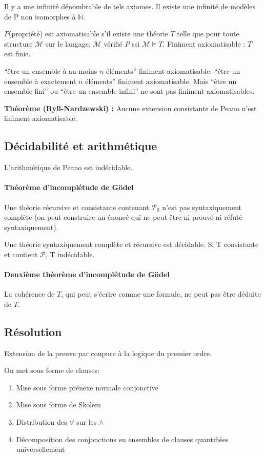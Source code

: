 \documentclass[french]{article}
\begin{document}
Il y a une infinité dénombrable de tels axiomes. Il existe une infinité de modèles de P non isomorphes à $\mathbb{N}$.

$P$(propriété) est axiomatisable s'il existe une théorie $T$ telle que pour toute structure $\mathcal{M}$ sur le langage, $\mathcal{M}$ vérifié $P$ ssi $\mathcal{M}\models T$. Finiment axiomatisable : $T$ est finie.

``être un ensemble à au moins $n$ éléments'' finiment axiomatisable.
``être un ensemble à exactement $n$ éléments'' finiment axiomatisable.
Mais ``être un ensemble fini'' ou ``être un ensemble infini'' ne sont pas finiment axiomatisables.

\textbf{Théorème (Ryll-Nardzewski) :} Aucune extension consistante de Peano n'est finiment axiomatisable.

\subsection{Décidabilité et arithmétique}
L'arithmétique de Peano est indécidable.
\paragraph{Théorème d'incomplétude de Gödel} Une théorie récursive et consistante contenant $\mathcal{P}_0$ n'est pas syntaxiquement complète (on peut construire un énoncé qui ne peut être ni prouvé ni réfuté syntaxiquement).

Une théorie syntaxiquement complète et récursive est décidable. Si T consistante et contient $\mathcal{P}$, T indécidable.

\paragraph{Deuxième théorème d'incomplétude de Gödel}
La cohérence de $T$, qui peut s'écrire comme une formule, ne peut pas être déduite de $T$.

\subsection{Résolution}
Extension de la preuve par coupure à la logique du premier ordre.

On met sous forme de clauses:
\begin{enumerate}
\item Mise sous forme prénexe normale conjonctive
\item Mise sous forme de Skolem
\item Distribution des $\forall$ sur les $\wedge$
\item Décomposition des conjonctions en ensembles de clauses quantifiées universellement
\end{enumerate}
\end{document}
